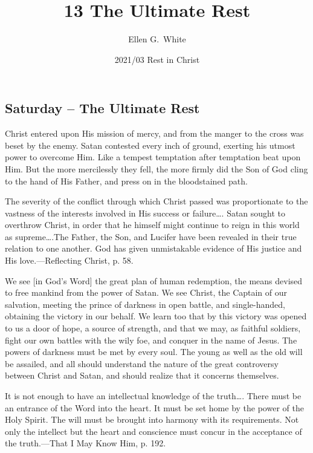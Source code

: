 \documentclass[a4paper, 10pt, twoside, headings=small]{scrartcl}
\title{13 The Ultimate Rest}
\author{Ellen G.\ White}
\date{2021/03 Rest in Christ}
\begin{document}
\maketitle

\thispagestyle{empty}

\pagestyle{fancy}

\begin{multicols}{2}

\section*{Saturday – The Ultimate Rest}

Christ entered upon His mission of mercy, and from the manger to the cross was beset by the enemy. Satan contested every inch of ground, exerting his utmost power to overcome Him. Like a tempest temptation after temptation beat upon Him. But the more mercilessly they fell, the more firmly did the Son of God cling to the hand of His Father, and press on in the bloodstained path.

The severity of the conflict through which Christ passed was proportionate to the vastness of the interests involved in His success or failure…. Satan sought to overthrow Christ, in order that he himself might continue to reign in this world as supreme….The Father, the Son, and Lucifer have been revealed in their true relation to one another. God has given unmistakable evidence of His justice and His love.—Reflecting Christ, p. 58.

We see [in God’s Word] the great plan of human redemption, the means devised to free mankind from the power of Satan. We see Christ, the Captain of our salvation, meeting the prince of darkness in open battle, and single-handed, obtaining the victory in our behalf. We learn too that by this victory was opened to us a door of hope, a source of strength, and that we may, as faithful soldiers, fight our own battles with the wily foe, and conquer in the name of Jesus. The powers of darkness must be met by every soul. The young as well as the old will be assailed, and all should understand the nature of the great controversy between Christ and Satan, and should realize that it concerns themselves.

It is not enough to have an intellectual knowledge of the truth…. There must be an entrance of the Word into the heart. It must be set home by the power of the Holy Spirit. The will must be brought into harmony with its requirements. Not only the intellect but the heart and conscience must concur in the acceptance of the truth.—That I May Know Him, p. 192.


\end{multicols}
\end{document}
